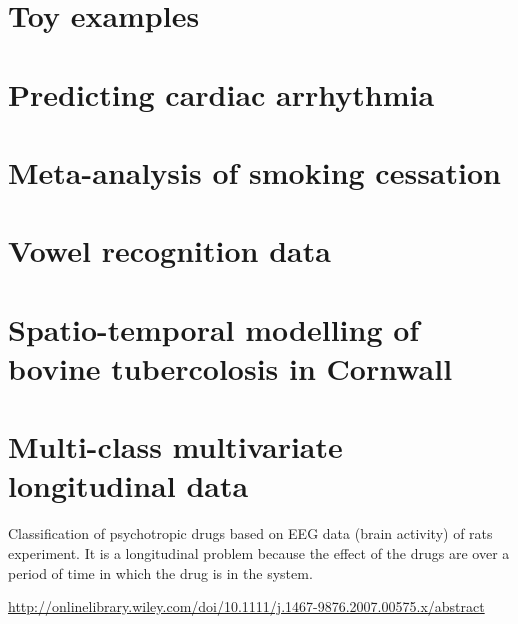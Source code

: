 \documentclass[a4paper,showframe,11pt]{report}
\begin{document}

\section{Toy examples}


\section{Predicting cardiac arrhythmia}


\section{Meta-analysis of smoking cessation}


\section{Vowel recognition data}


\section{Spatio-temporal modelling of bovine tubercolosis in Cornwall}


\section{Multi-class multivariate longitudinal data} 

Classification of psychotropic drugs based on EEG data (brain activity) of rats experiment. It is a longitudinal problem because the effect of the drugs are over a period of time in which the drug is in the system.


\url{http://onlinelibrary.wiley.com/doi/10.1111/j.1467-9876.2007.00575.x/abstract}           

\hClosingStuffStandalone
\end{document}
